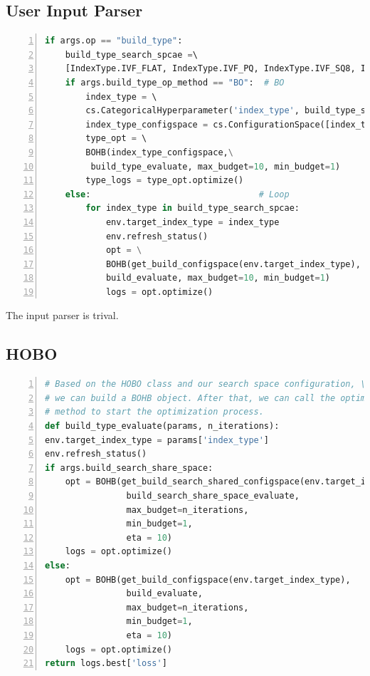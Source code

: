 \documentclass{ol-softwaremanual}
\begin{document}
\subsection{User Input Parser}
\begin{lstlisting}[language=python,numbers=left,basicstyle=\footnotesize, caption={Input Parser}]
if args.op == "build_type":
    build_type_search_spcae =\ 
    [IndexType.IVF_FLAT, IndexType.IVF_PQ, IndexType.IVF_SQ8, IndexType.HNSW]
    if args.build_type_op_method == "BO":  # BO
        index_type = \ 
        cs.CategoricalHyperparameter('index_type', build_type_search_spcae)
        index_type_configspace = cs.ConfigurationSpace([index_type], seed=123)
        type_opt = \ 
        BOHB(index_type_configspace,\
         build_type_evaluate, max_budget=10, min_budget=1)
        type_logs = type_opt.optimize()
    else:                                 # Loop
        for index_type in build_type_search_spcae:
            env.target_index_type = index_type
            env.refresh_status()
            opt = \
            BOHB(get_build_configspace(env.target_index_type), \ 
            build_evaluate, max_budget=10, min_budget=1)
            logs = opt.optimize()
\end{lstlisting}

The input parser is trival.

\subsection{HOBO}
\begin{lstlisting}[language=python,numbers=left,basicstyle=\footnotesize, caption={HOBO}]
# Based on the HOBO class and our search space configuration, \ 
# we can build a BOHB object. After that, we can call the optimize() \ 
# method to start the optimization process.
def build_type_evaluate(params, n_iterations):
env.target_index_type = params['index_type']
env.refresh_status()
if args.build_search_share_space:
    opt = BOHB(get_build_search_shared_configspace(env.target_index_type),  
                build_search_share_space_evaluate, 
                max_budget=n_iterations, 
                min_budget=1, 
                eta = 10)
    logs = opt.optimize()
else:
    opt = BOHB(get_build_configspace(env.target_index_type), 
                build_evaluate, 
                max_budget=n_iterations, 
                min_budget=1,  
                eta = 10)
    logs = opt.optimize()
return logs.best['loss']
\end{lstlisting}
\end{document}
